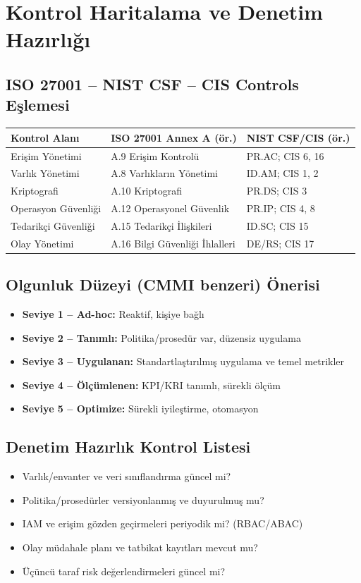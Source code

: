 \section{Kontrol Haritalama ve Denetim Hazırlığı}

\subsection{ISO 27001 – NIST CSF – CIS Controls Eşlemesi}
\begin{longtable}{|p{3.5cm}|p{5.5cm}|p{5.5cm}|}
\hline
\rowcolor{tableheadcolor}
\textbf{Kontrol Alanı} & \textbf{ISO 27001 Annex A (ör.)} & \textbf{NIST CSF/CIS (ör.)} \\
\hline
Erişim Yönetimi & A.9 Erişim Kontrolü & PR.AC; CIS 6, 16 \\
\hline
Varlık Yönetimi & A.8 Varlıkların Yönetimi & ID.AM; CIS 1, 2 \\
\hline
Kriptografi & A.10 Kriptografi & PR.DS; CIS 3 \\
\hline
Operasyon Güvenliği & A.12 Operasyonel Güvenlik & PR.IP; CIS 4, 8 \\
\hline
Tedarikçi Güvenliği & A.15 Tedarikçi İlişkileri & ID.SC; CIS 15 \\
\hline
Olay Yönetimi & A.16 Bilgi Güvenliği İhlalleri & DE/RS; CIS 17 \\
\hline
\end{longtable}

\subsection{Olgunluk Düzeyi (CMMI benzeri) Önerisi}
\begin{itemize}
  \item \textbf{Seviye 1 – Ad-hoc:} Reaktif, kişiye bağlı
  \item \textbf{Seviye 2 – Tanımlı:} Politika/prosedür var, düzensiz uygulama
  \item \textbf{Seviye 3 – Uygulanan:} Standartlaştırılmış uygulama ve temel metrikler
  \item \textbf{Seviye 4 – Ölçümlenen:} KPI/KRI tanımlı, sürekli ölçüm
  \item \textbf{Seviye 5 – Optimize:} Sürekli iyileştirme, otomasyon
\end{itemize}

\subsection{Denetim Hazırlık Kontrol Listesi}
\begin{itemize}
  \item Varlık/envanter ve veri sınıflandırma güncel mi?
  \item Politika/prosedürler versiyonlanmış ve duyurulmuş mu?
  \item IAM ve erişim gözden geçirmeleri periyodik mi? (RBAC/ABAC)
  \item Olay müdahale planı ve tatbikat kayıtları mevcut mu?
  \item Üçüncü taraf risk değerlendirmeleri güncel mi?
\end{itemize}


